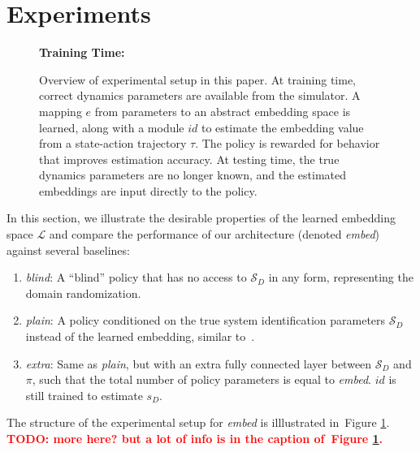 \documentclass{article}
\newcommand{\TODO}[1]{\textcolor{red}{\textbf{TODO: #1}}}
\newcommand{\cL}{\mathcal{L}}
\newcommand{\cS}{\mathcal{S}}
\newcommand{\blind}{\emph{blind}}
\newcommand{\plain}{\emph{plain}}
\newcommand{\extra}{\emph{extra}}
\newcommand{\embed}{\emph{embed}}
\newcommand{\traj}{\emph{traj}}
\newcommand{\embedfn}{e}
\newcommand{\idfn}{id}
\newcommand{\latent}{\cL}
\newcommand{\figref}[1]{Figure \ref{#1}}
\begin{document}
\section{Experiments}

\begin{figure}[h]
\centering
\textbf{Training Time:}

\vspace{0.4cm}

\vspace{0.4cm}
\caption{
Overview of experimental setup in this paper.
At training time, correct dynamics parameters are available from the simulator.
A mapping $\embedfn$ from parameters to an abstract embedding space is learned,
along with a module $\idfn$ to estimate the embedding value from a state-action trajectory $\tau$.
The policy is rewarded for behavior that improves estimation accuracy.
At testing time, the true dynamics parameters are no longer known,
and the estimated embeddings are input directly to the policy.
}
\label{fig:overview}
\end{figure}

In this section, we illustrate the desirable properties of the learned embedding space $\latent$
and compare the performance of our architecture (denoted \embed) against several baselines:
\begin{enumerate}
\item \blind: A ``blind'' policy that has no access to $\cS_D$ in any form, representing the domain randomization.
\item \plain: A policy conditioned on the true system identification parameters $\cS_D$ instead of the learned embedding, similar to~\citet{yu-up-osi-rss17}.
\item \extra: Same as \plain, but with an extra fully connected layer between $\cS_D$ and $\pi$, such that the total number of policy parameters is equal to \embed.
$\idfn$ is still trained to estimate $s_D$.
\end{enumerate}
The structure of the experimental setup for \embed{} is illlustrated in~\figref{fig:overview}.
\TODO{more here? but a lot of info is in the caption of~\figref{fig:overview}.}
\end{document}
